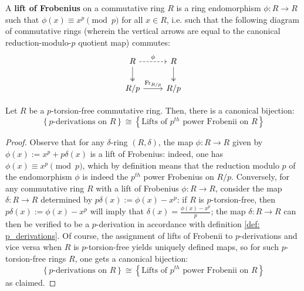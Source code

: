             \begin{definition} \label{def: lifts_of_frobenii}
                A \textbf{lift of Frobenius} on a commutative ring $R$ is a ring endomorphism $\phi: R \to R$ such that $\phi(x) \equiv x^p \pmod{p}$ for all $x \in R$, i.e. such that the following diagram of commutative rings (wherein the vertical arrows are equal to the canonical reduction-modulo-$p$ quotient map) commutes:
                    $$
                        \begin{tikzcd}
                        	R & R \\
                        	{R/p} & {R/p}
                        	\arrow[two heads, from=1-1, to=2-1]
                        	\arrow[two heads, from=1-2, to=2-2]
                        	\arrow["{\Frob_{R/p}}", from=2-1, to=2-2]
                        	\arrow["\phi", dashed, from=1-1, to=1-2]
                        \end{tikzcd}
                    $$
            \end{definition}
            \begin{proposition} \label{prop: p_derivations_and_lifts_of_frobenii}
                Let $R$ be a $p$-torsion-free commutative ring. Then, there is a canonical bijection:
                    $$
                        \left\{\text{$p$-derivations on $R$}\right\}
                        \cong
                        \left\{\text{Lifts of $p^{th}$ power Frobenii on $R$}\right\}
                    $$
            \end{proposition}
                \begin{proof}
                    Observe that for any $\delta$-ring $(R, \delta)$, the map $\phi: R \to R$ given by $\phi(x) := x^p + p\delta(x)$ is a lift of Frobenius: indeed, one has $\phi(x) \equiv x^p \pmod{p}$, which by definition means that the reduction modulo $p$ of the endomorphism $\phi$ is indeed the $p^{th}$ power Frobenius on $R/p$. Conversely, for any commutative ring $R$ with a lift of Frobenius $\phi: R \to R$, consider the map $\delta: R \to R$ determined by $p \delta(x) := \phi(x) - x^p$: if $R$ is $p$-torsion-free, then $p \delta(x) := \phi(x) - x^p$ will imply that $\delta(x) = \frac{\phi(x) - x^p}{p}$; the map $\delta: R \to R$ can then be verified to be a $p$-derivation in accordance with definition \ref{def: p_derivations}. Of course, the assignment of lifts of Frobenii to $p$-derivations and vice versa when $R$ is $p$-torsion-free yields uniquely defined maps, so for such $p$-torsion-free rings $R$, one gets a canonical bijection:
                        $$
                            \left\{\text{$p$-derivations on $R$}\right\}
                            \cong
                            \left\{\text{Lifts of $p^{th}$ power Frobenii on $R$}\right\}
                        $$
                    as claimed.
                \end{proof}
